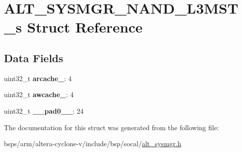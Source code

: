 \hypertarget{structALT__SYSMGR__NAND__L3MST__s}{}\section{A\+L\+T\+\_\+\+S\+Y\+S\+M\+G\+R\+\_\+\+N\+A\+N\+D\+\_\+\+L3\+M\+S\+T\+\_\+s Struct Reference}
\label{structALT__SYSMGR__NAND__L3MST__s}
\subsection*{Data Fields}
\begin{DoxyCompactItemize}
\item 
\mbox{\label{structALT__SYSMGR__NAND__L3MST__s_a4ed359f5f7e9cc4d3488c5009e326076}} 
uint32\+\_\+t {\bfseries arcache\+\_}\+: 4
\item 
\mbox{\label{structALT__SYSMGR__NAND__L3MST__s_aa39554a5c6255e5ca134c3ce1b235b37}} 
uint32\+\_\+t {\bfseries awcache\+\_}\+: 4
\item 
\mbox{\label{structALT__SYSMGR__NAND__L3MST__s_acfb7ba065e315d5838f75ab0c48fa6dc}} 
uint32\+\_\+t {\bfseries \+\_\+\+\_\+pad0\+\_\+\+\_\+}\+: 24
\end{DoxyCompactItemize}


The documentation for this struct was generated from the following file\+:\begin{DoxyCompactItemize}
\item 
bsps/arm/altera-\/cyclone-\/v/include/bsp/socal/\mbox{\hyperlink{alt__sysmgr_8h}{alt\+\_\+sysmgr.\+h}}\end{DoxyCompactItemize}
